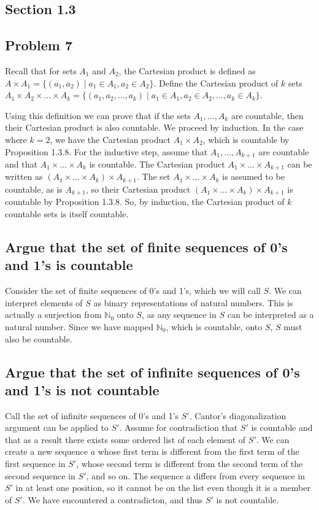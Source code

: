 \documentclass[11pt]{article}
\newcommand{\N}{\mathbb{N}}
\begin{document}
\subsection*{Section 1.3}
\subsection*{Problem 7}

Recall that for sets $A_1$ and $A_2$, the Cartesian product is defined as  
$A \times A_1 = \{ (a_1, a_2) \mid a_1 \in A_1, a_2 \in A_2\} $.
Define the Cartesian product of $k$ sets 
$A_1 \times A_2 \times \ldots \times A_k =
\{ (a_1, a_2, \ldots, a_k) \mid a_1 \in A_1, a_2 \in A_2, \ldots, a_k \in A_k\}$.

Using this definition we can prove that if the sets $A_1, \ldots, A_k$ are 
countable, then their Cartesian product is also countable. We proceed by induction.
In the case where $k = 2$, we have the Cartesian product $A_1 \times A_2$, which
is countable by Proposition 1.3.8.
For the inductive step, assume that $A_1,\ldots,A_{k+1}$ are countable and that
$A_1 \times \ldots \times A_k$ is countable. The Cartesian product
$A_1 \times \ldots \times A_{k+1}$ can be written as
$(A_1 \times \ldots \times A_k) \times A_{k+1}$. The set $A_1 \times \ldots \times A_k$
is assumed to be countable, as is $A_{k+1}$, so their Cartesian product 
$(A_1 \times \ldots \times A_k) \times A_{k+1}$ is countable by 
Proposition 1.3.8. So, by induction, the Cartesian product of $k$
countable sets is itself countable.

\subsection*{Argue that the set of finite sequences of 0's and 1's is countable}

Consider the set of finite sequences of 0's and 1's, which we will call $S$.
We can interpret elements of $S$ as binary representations of natural numbers.
This is actually a surjection from $\N_0$ onto $S$, as any 
sequence in $S$ can be interpreted as a natural number. Since we have mapped
$\N_0$, which is countable, onto $S$, $S$ must also be countable.

\subsection*{Argue that the set of infinite sequences of 0's and 1's is not countable}

Call the set of infinite sequences of 0's and 1's $S'$. Cantor's diagonalization
argument can be applied to $S'$. Assume for contradiction that $S'$ is countable
and that as a result there exists some ordered list of each element of $S'$.
We can create
a new sequence $a$ whose first term is different from the first term of the 
first sequence in $S'$, whose second term is different from the second term
of the second sequence in $S'$, and so on. The sequence $a$ differs from every
sequence in $S'$ in at least one position, so it cannot be on the list even though
it is a member of $S'$. We have encountered a contradicton, and thus 
$S'$ is not countable.
\end{document}
